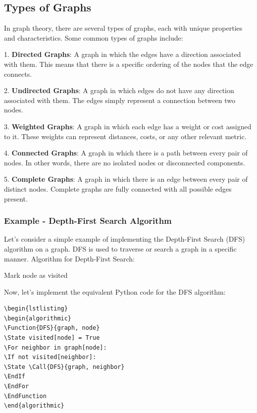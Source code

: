 \documentclass[12pt]{book} %
\begin{document}
\subsection{Types of Graphs}

In graph theory, there are several types of graphs, each with unique properties and characteristics. Some common types of graphs include:

1. \textbf{Directed Graphs}: A graph in which the edges have a direction associated with them. This means that there is a specific ordering of the nodes that the edge connects.

2. \textbf{Undirected Graphs}: A graph in which edges do not have any direction associated with them. The edges simply represent a connection between two nodes.

3. \textbf{Weighted Graphs}: A graph in which each edge has a weight or cost assigned to it. These weights can represent distances, costs, or any other relevant metric.

4. \textbf{Connected Graphs}: A graph in which there is a path between every pair of nodes. In other words, there are no isolated nodes or disconnected components.

5. \textbf{Complete Graphs}: A graph in which there is an edge between every pair of distinct nodes. Complete graphs are fully connected with all possible edges present.

\subsubsection{Example - Depth-First Search Algorithm}

Let's consider a simple example of implementing the Depth-First Search (DFS) algorithm on a graph. DFS is used to traverse or search a graph in a specific manner.
\FloatBarrier
Algorithm for Depth-First Search:
\FloatBarrier
\begin{algorithm}
\caption{Depth-First Search}
\begin{algorithmic}[1]
\State Mark node as visited
\State {}
\EndIf
\EndFor
\EndFunction
\end{algorithmic}
\end{algorithm}
\FloatBarrier
Now, let's implement the equivalent Python code for the DFS algorithm:
\FloatBarrier
\begin{lstlisting}
\begin{lstlisting}
\begin{algorithmic}
\Function{DFS}{graph, node}
\State visited[node] = True
\For neighbor in graph[node]:
\If not visited[neighbor]:
\State \Call{DFS}{graph, neighbor}
\EndIf
\EndFor
\EndFunction
\end{algorithmic}
\end{lstlisting}
\FloatBarrier
\end{document}
